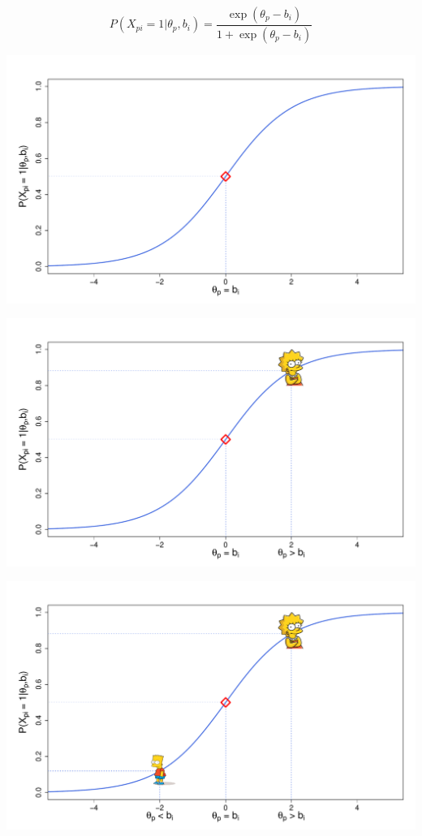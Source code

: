 \documentclass[aspectratio=149, compress]{beamer}
\begin{document}
\begin{frame}
	
	
	\begin{equation*}
		P(X_{pi} = 1|\theta_p, b_i) = \dfrac{\exp(\theta_p - b_i)}{1 + \exp(\theta_p - b_i)}
	\end{equation*}
	
	
	\begin{overprint}
		\centering
		\centering
		\includegraphics[width=.8\linewidth]{img/base.pdf}
		
		\centering
		\centering
		\includegraphics[width=.8\linewidth]{img/lisa.pdf}
		
		\centering
		\centering
		\includegraphics[width=.8\linewidth]{img/bart.pdf}
	\end{overprint}
	
\end{frame}
\end{document}
